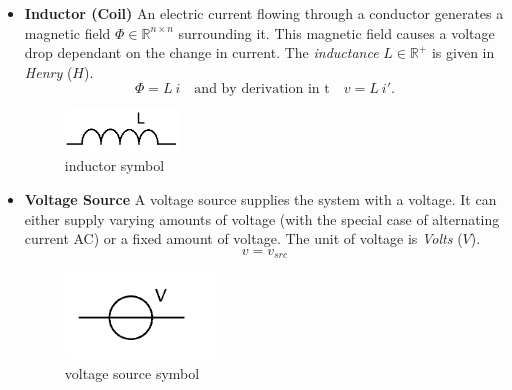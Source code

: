 \begin{itemize}
	\item \textbf{Inductor (Coil)} \newline
	An electric current flowing through a conductor generates a magnetic field $\Phi \in \mathbb{R}^{n \times n}$ surrounding it. This magnetic field causes a voltage drop dependant on the change in current. The \emph{inductance} $L \in \mathbb{R}^+$ is given in \emph{Henry} ($H$).
	\begin{equation}
		\label{eq:inductor law}
		\Phi = L \ i \quad \text{and by derivation in t} \quad v = L \ i'.
	\end{equation}
	\begin{figure}[H]
		\label{fig:inductor symbol}
		\centering
		\includegraphics[width=3cm]{pictures/inductance.png}
		\caption{inductor symbol}
	\end{figure}

	\item \textbf{Voltage Source} \newline
	A voltage source supplies the system with a voltage. It can either supply varying amounts of voltage (with the special case of alternating current AC) or a fixed amount of voltage. The unit of voltage is \emph{Volts} ($V$).
	\begin{equation}
		\label{eq:voltage source law}
		v = v_{src}
	\end{equation}
	\begin{figure}[H]
		\label{fig:voltage source symbol}
		\centering
		\includegraphics[width=4cm]{pictures/voltage_source.png}
		\caption{voltage source symbol}
	\end{figure}


\end{itemize}

